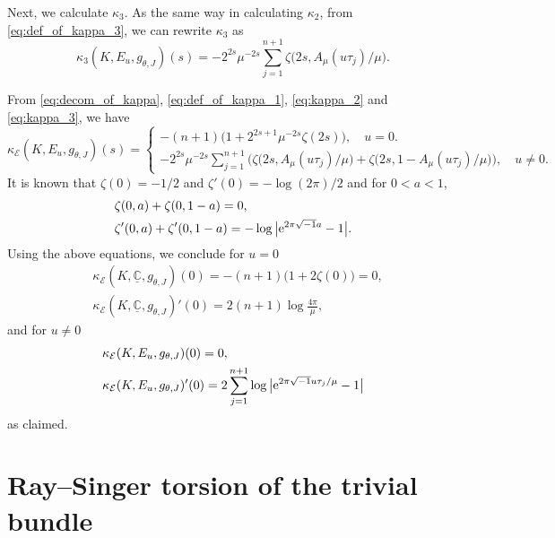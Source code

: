 \documentclass[10pt,a4paper]{amsart}
\numberwithin{equation}{section}
\newcommand{\ii}{\sqrt{-1}}
\newcommand{\RN}{\cE}
\newcommand{\bC}{\mathbb{C}}
\newcommand{\cE}{\mathcal{E}}
\begin{document}
Next, we calculate $\kappa_{3}$.
As the same way in calculating $\kappa_{2}$,
from \eqref{eq:def_of_kappa_3},
we can rewrite $\kappa_{3}$ as
\begin{equation}
 \kappa_{3} ( K, E_{u} , g_{\theta , J} ) (s)
 =
 -
 2^{2s} \mu^{-2s}
 \sum_{j=1}^{n+1}
 \zeta \bigl( 2s , A_{\mu} ( u {\tau}_j) / \mu \bigr)
 .
 \label{eq:kappa_3}
\end{equation}

From \eqref{eq:decom_of_kappa}, \eqref{eq:def_of_kappa_1}, \eqref{eq:kappa_2} and \eqref{eq:kappa_3},
we have
\[
 \kappa_{\RN} ( K, E_{u} , g_{\theta , J} ) (s)
 =
 \begin{cases}
 \displaystyle
 -(n+1)
 \bigl( 1+
 2^{2s+1}
 \mu^{-2s}
 \zeta (2s)
 \bigr)
 ,
 \quad
 u = 0 .
 \\
 \displaystyle
 -
 2^{2s} \mu^{-2s}
 \sum_{j=1}^{n+1}
 \big(
 \zeta \bigl( 2s , A_{\mu} (u {\tau}_j) / \mu \bigr)
 +
 \zeta \bigl( 2s , 1 - A_{\mu} (u {\tau}_j) / \mu \bigr)
 \big)
 ,
 \quad
 u \not = 0 .
 \end{cases}
\]
It is known that
$\zeta (0) = -1/2$ and $\zeta ' (0) = - \log (2 \pi)/2$
and for $0 < a < 1$,
\begin{align*}
& \zeta (0 ,a) + \zeta (0 , 1-a)
 = 0 , \\
& \zeta ' (0 ,a) + \zeta ' (0 , 1-a)
 = - \log \big| {\rm e}^{2 \pi \ii a} -1 \big|
 .
\end{align*}
Using the above equations,
we conclude
for $u = 0$
\begin{align*}
& \kappa_{\RN} (K, \underline{\bC} , g_{\theta , J} ) (0)
 =
 - (n+1) \bigl( 1 + 2 \zeta (0) \bigl) = 0
 ,
 \\
& \kappa_{\RN} (K, \underline{\bC} , g_{\theta , J} ) ' (0)
 =
 2 (n+1) \log \frac{4 \pi}{\mu}
 ,
\end{align*}
and
for $u \not = 0$
\begin{align*}
& \kappa_\RN (K, E_{u} , g_{\theta , J} ) (0)
 = 0
 ,
 \\
& \kappa_\RN (K, E_{u} , g_{\theta , J} ) ' (0)
 =
 2 \sum_{j=1}^{n+1} \log \big| {\rm e}^{ 2 \pi \ii u {\tau}_j / \mu } -1 \big|
\end{align*}
as claimed.




\section{Ray--Singer torsion of the trivial bundle}
\label{sec:Ray--Singer_torsion_on_the_trivial_vector_bundle}
\end{document}
